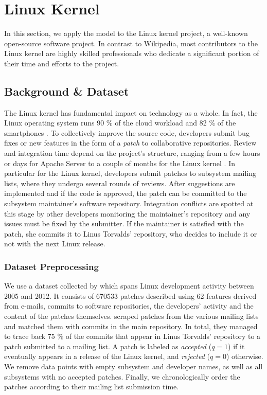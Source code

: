 \section{Linux Kernel}
\label{sec:linux}

In this section, we apply the \interank{} model to the Linux kernel project, a well-known open-source software project.
In contrast to Wikipedia, most contributors to the Linux kernel are highly skilled professionals who dedicate a significant portion of their time and efforts to the project.

\subsection{Background \& Dataset}

The Linux kernel has fundamental impact on technology as a whole.
In fact, the Linux operating system runs 90 \% of the cloud workload and 82 \% of the smartphones \citep{corbet2017linux}.
To collectively improve the source code, developers submit bug fixes or new features in the form of a \emph{patch} to collaborative repositories.
Review and integration time depend on the project's structure, ranging from a few hours or days for Apache Server \citep{rigby2008open} to a couple of months for the Linux kernel \citep{jiang2013will}.
In particular for the Linux kernel, developers submit patches to subsystem mailing lists, where they undergo several rounds of reviews.
After suggestions are implemented and if the code is approved, the patch can be committed to the subsystem maintainer's software repository.
Integration conflicts are spotted at this stage by other developers monitoring the maintainer's repository and any issues must be fixed by the submitter.
If the maintainer is satisfied with the patch, she commits it to Linus Torvalds' repository, who decides to include it or not with the next Linux release.

\subsubsection{Dataset Preprocessing}

We use a dataset collected by \citet{jiang2013will} which spans Linux development activity between 2005 and 2012.
It consists of \num{670 533} patches described using \num{62} features derived from e-mails, commits to software repositories, the developers' activity and the content of the patches themselves.
\citeauthor{jiang2013will} scraped patches from the various mailing lists and matched them with commits in the main repository.
In total, they managed to trace back 75 \% of the commits that appear in Linus Torvalds' repository to a patch submitted to a mailing list.
A patch is labeled as \emph{accepted} ($q = 1$) if it eventually appears in a release of the Linux kernel, and \emph{rejected} ($q = 0$) otherwise.
We remove data points with empty subsystem and developer names, as well as all subsystems with no accepted patches.
Finally, we chronologically order the patches according to their mailing list submission time.

